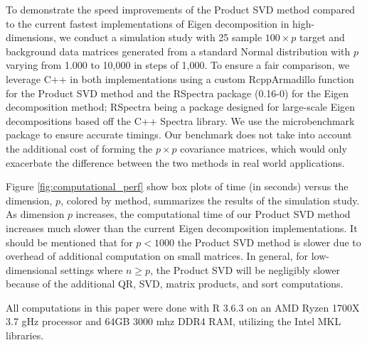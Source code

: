 \documentclass[12pt]{article}
\begin{document}
To demonstrate the speed improvements of the Product SVD method compared to the current fastest implementations of Eigen decomposition in high-dimensions, we conduct a simulation study with 25 sample $100 \times p$ target and background data matrices generated from a standard Normal distribution with $p$ varying from 1.000 to 10,000 in steps of 1,000. To ensure a fair comparison, we leverage C++ in both implementations using a custom RcppArmadillo \cite{rcpparmadillo} function for the Product SVD method and the RSpectra package (0.16-0) \cite{Rspectra} for the Eigen decomposition method; RSpectra being a package designed for large-scale Eigen decompositions based off the C++ Spectra library. We use the microbenchmark package \cite{microbenchmark} to ensure accurate timings. Our benchmark does not take into account the additional cost of forming the $p\times p$ covariance matrices, which would only exacerbate the difference between the two methods in real world applications.

Figure \ref{fig:computational_perf} show box plots of time (in seconds) versus the dimension, $p$, colored by method, summarizes the results of the simulation study. As dimension $p$ increases, the computational time of our Product SVD method increases much slower than the current Eigen decomposition implementations. It should be mentioned that for $p < 1000$ the Product SVD method is slower due to overhead of additional computation on small matrices. In general, for low-dimensional settings where $n \geq p$, the Product SVD will be negligibly slower because of the additional QR, SVD, matrix products, and sort computations. 

 
 All computations in this paper were done with R 3.6.3 \cite{baseR} on an AMD Ryzen 1700X 3.7 gHz processor and 64GB 3000 mhz DDR4 RAM, utilizing the Intel MKL libraries. 
 
\end{document}
